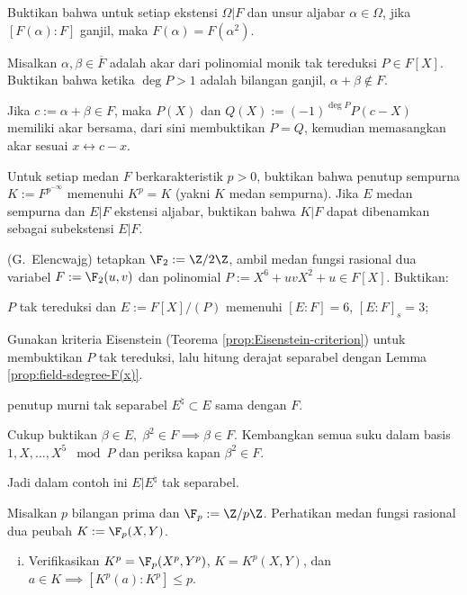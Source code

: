 \begin{Exercises}
	\item Buktikan bahwa untuk setiap ekstensi $\Omega|F$ dan unsur aljabar $\alpha \in \Omega$, jika $[F(\alpha):F]$ ganjil, maka $F(\alpha)=F(\alpha^2)$.
	\item Misalkan $\alpha, \beta \in \overline{F}$ adalah akar dari polinomial monik tak tereduksi $P \in F[X]$. Buktikan bahwa ketika $\deg P > 1$ adalah bilangan ganjil, $\alpha+\beta \notin F$.
	\begin{hint} Jika $c := \alpha + \beta \in F$, maka $P(X)$ dan $Q(X) := (-1)^{\deg P} P(c-X)$ memiliki akar bersama, dari sini membuktikan $P=Q$, kemudian memasangkan akar sesuai $x \leftrightarrow c-x$.\end{hint}
	\item Untuk setiap medan $F$ berkarakteristik $p>0$, buktikan bahwa penutup sempurna $K := F^{p^{-\infty}}$ memenuhi $K^p = K$ (yakni $K$ medan sempurna). Jika $E$ medan sempurna dan $E|F$ ekstensi aljabar, buktikan bahwa $K|F$ dapat dibenamkan sebagai subekstensi $E|F$.
	\item (G.\ Elencwajg) tetapkan $\F_2 := \Z/2\Z$, ambil medan fungsi rasional dua variabel $F := \F_2(u,v)$ dan polinomial $P := X^6 + uvX^2 + u \in F[X]$. Buktikan:
		\begin{compactenum}[(i)]
			\item $P$ tak tereduksi dan $E := F[X]/(P)$ memenuhi $[E:F]=6$, $[E:F]_s = 3$; \begin{hint} Gunakan kriteria Eisenstein (Teorema \ref{prop:Eisenstein-criterion}) untuk membuktikan $P$ tak tereduksi, lalu hitung derajat separabel dengan Lemma \ref{prop:field-sdegree-F(x)}. \end{hint}
			\item penutup murni tak separabel $E^\natural \subset E$ sama dengan $F$. \begin{hint} Cukup buktikan $\beta \in E, \; \beta^2 \in F \implies \beta \in F$. Kembangkan semua suku dalam basis $1, X, \ldots, X^5 \; \bmod P$ dan periksa kapan $\beta^2 \in F$. \end{hint}
		\end{compactenum}
		Jadi dalam contoh ini $E|E^\natural$ tak separabel.
	\item Misalkan $p$ bilangan prima dan $\F_p := \Z/p\Z$. Perhatikan medan fungsi rasional dua peubah $K := \F_p(X,Y)$.
		\begin{enumerate}[(i)]
			\item Verifikasikan $K^p = \F_p(X^p, Y^p)$, $K=K^p(X,Y)$, dan $a \in K \implies [K^p(a) : K^p] \leq p$.

\end{enumerate}
\end{Exercises}
